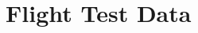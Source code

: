 \chapter{Flight Test Data}
\label{app:flightdata}
\begin{comment}
The pilot was instructed to take-off, fly about a meter in direction, and land on a specific location. The graphs show how the entire route in z-direction. 


Fig. \ref{VPQ1zAxisTomas} shows the same ground effect tendency as in Fig. \ref{VPQzAxisTommy}. The bouncing effect seems starts to appear around 500mm above ground. 

\begin{figure}[H]
    \centering
         \texttt{[image: VAPIQ-PICTURES/VPQ2.jpg]}
      \caption{Fixed pitch landings z-axis}
    \label{VPQ2zAxisTomas}
\end{figure} 

\begin{figure}[H]
    \centering
         \texttt{[image: VAPIQ-PICTURES/FPQ1.jpg]}
      \caption{Variable pitch landings z-axis}
    \label{FPQ1zAxisTomas}
\end{figure}  


\begin{figure}[H]
    \centering
         \texttt{[image: VAPIQ-PICTURES/VPQ1.jpg]}
      \caption{Variable pitch landings z-axis}
    \label{VPQ1zAxisTomas}
\end{figure}   

\begin{figure}[H]
    \centering
         \texttt{[image: VAPIQ-PICTURES/FPQ2.jpg]}
      \caption{Fixed pitch landings z-axis}
    \label{FPQ2zAxisTomas}
\end{figure}


\begin{figure}[H]
    \centering
         \texttt{[image: VAPIQ-PICTURES/z-axis-VPQ.jpg]} %
      \caption{Variable pitch landings z-axis}
    \label{VPQzAxisTommy}
\end{figure} 

\begin{figure}[H]
    \centering
         \texttt{[image: VAPIQ-PICTURES/z-axis-FPQ.jpg]}
      \caption{Fixed pitch landings z-axis}
    \label{FPQzAxisTommy}
\end{figure} 


\end{comment}
